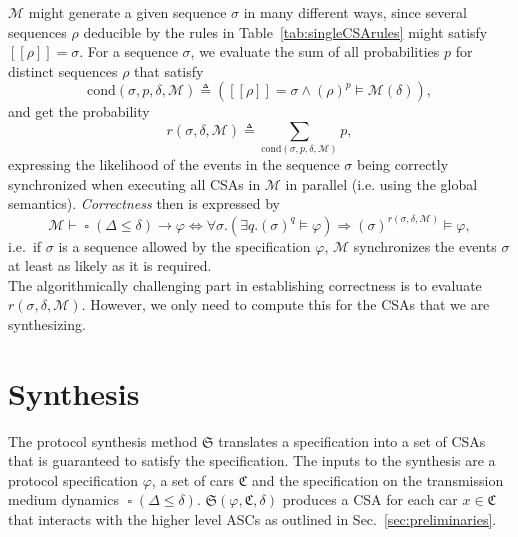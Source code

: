 \documentclass{sig-alternate}
\DeclareMathOperator{\always}{\mathop\square}
\renewcommand{\v}{\varphi}
\renewcommand{\d}{\delta}
\newcommand{\dropprob}{\Delta}
\newcommand{\M}{\mathcal{M}}
\newcommand{\SAP}{\mathfrak{C}}
\newcommand{\Synth}{\mathfrak{S}}
\newcommand{\cond}{\mathrm{cond}}
\newcommand{\generated}{\models {\M(\d)}}
\newcommand{\proj}[1]{[\![{#1}]\!]}
\newcommand{\define}{\sl}
\renewcommand{\sec}[1]{Sec.\ \ref{sec:#1}}
\newcommand{\tab}[1]{Table~\ref{tab:#1}}
\begin{document}
$\M$ might generate a given sequence $\sigma$ in many different ways, since several sequences $\rho$ deducible by the rules in \tab{singleCSArules} might satisfy $\proj{\rho} = \sigma$. For a sequence $\sigma$, we evaluate the sum of all probabilities $p$ for distinct sequences $\rho$ that satisfy
\begin{equation*}
	\cond(\sigma, p, \d, \M) \triangleq (\proj{\rho} = \sigma \wedge (\rho)^p \generated),
\end{equation*}
and get the probability
\begin{equation*}
	r(\sigma, \d, \M) \triangleq \sum_{\cond(\sigma, p, \d, \M)}{p},
\end{equation*}
expressing the likelihood of the events in the sequence $\sigma$ being correctly synchronized when executing all CSAs in $\M$ in parallel (i.e. using the global semantics). {\define Correctness} then is expressed by
\begin{equation*}
	\M \vdash \always(\dropprob \leq \d) \rightarrow \v  \Leftrightarrow  \forall \sigma . (\exists q . (\sigma)^q \models \v) \Rightarrow (\sigma)^{r(\sigma, \d, \M)} \models \v,
\end{equation*}
i.e.\ if $\sigma$ is a sequence allowed by the specification $\v$, $\M$ synchronizes the events $\sigma$ at least as likely as it is required.\\
The algorithmically challenging part in establishing correctness is to evaluate $r(\sigma, \d, \M)$. However, we only need to compute this for the CSAs that we are synthesizing.












\vspace{-.06in}



\section{Synthesis} \label{sec:method}

The protocol synthesis method $\Synth$ translates a specification into a set of CSAs that is guaranteed to satisfy the specification. The inputs to the synthesis are a protocol specification $\v$, a set of cars $\SAP$ and the specification on the transmission medium dynamics $\always(\dropprob \leq \d)$. $\Synth(\v, \SAP, \d)$ produces a CSA for each car $x \in \SAP$ that interacts with the higher level ASCs as outlined in \sec{preliminaries}.
\end{document}
